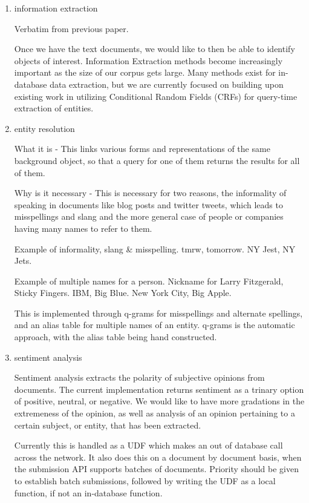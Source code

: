 \documentclass{article}
\begin{document}
\begin{enumerate}
\begin{enumerate}
    \begin{enumerate}
    \item information extraction

      Verbatim from previous paper.

      Once we have the text documents, we would like to then be able to identify
      objects of interest. Information Extraction methods become increasingly
      important as the size of our corpus gets large. Many methods exist for in-database data
      extraction, but we are currently focused on building upon existing work in
      utilizing Conditional Random Fields (CRFs) for query-time extraction of
      entities.

    \item entity resolution

      What it is -
      This links various forms and representations of the same background object,
      so that a query for one of them returns the results for all of them.

      Why is it necessary -
      This is necessary for two reasons,
      the informality of speaking in documents like blog posts and twitter tweets,
      which leads to misspellings and slang
      and the more  general case of people or companies having many names to refer to them.

      Example of informality, slang \& misspelling. tmrw, tomorrow. NY Jest, NY Jets.

      Example of multiple names for a person. Nickname for Larry Fitzgerald, Sticky Fingers. IBM, Big Blue. New York City, Big Apple.

      This is implemented through q-grams for misspellings and alternate spellings,
      and an alias table for multiple names of an entity.
      q-grams is the automatic approach,
      with the alias table being hand constructed.

    \item sentiment analysis

      Sentiment analysis extracts the polarity of subjective opinions from documents.
      The current implementation returns sentiment as a trinary option of positive, neutral, or negative.
      We would like to have more gradations in the extremeness of the opinion,
      as well as analysis of an opinion pertaining to a certain subject, or entity, that has been extracted.

      Currently this is handled as a UDF which makes an out of database call across the network.
      It also does this on a document by document basis,
      when the submission API supports batches of documents.
      Priority should be given to establish batch submissions,
      followed by writing the UDF as a local function,
      if not an in-database function.


\end{enumerate}
\end{enumerate}
\end{enumerate}
\end{document}
